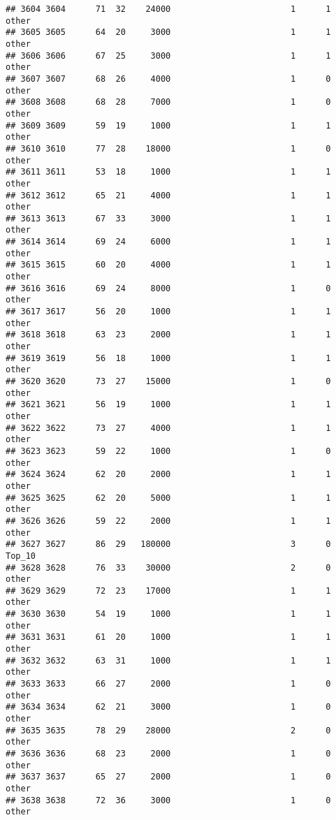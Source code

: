 \documentclass[
]{article}
\begin{document}
\begin{verbatim}
## 3604 3604      71  32    24000                        1      1    other
## 3605 3605      64  20     3000                        1      1    other
## 3606 3606      67  25     3000                        1      1    other
## 3607 3607      68  26     4000                        1      0    other
## 3608 3608      68  28     7000                        1      0    other
## 3609 3609      59  19     1000                        1      1    other
## 3610 3610      77  28    18000                        1      0    other
## 3611 3611      53  18     1000                        1      1    other
## 3612 3612      65  21     4000                        1      1    other
## 3613 3613      67  33     3000                        1      1    other
## 3614 3614      69  24     6000                        1      1    other
## 3615 3615      60  20     4000                        1      1    other
## 3616 3616      69  24     8000                        1      0    other
## 3617 3617      56  20     1000                        1      1    other
## 3618 3618      63  23     2000                        1      1    other
## 3619 3619      56  18     1000                        1      1    other
## 3620 3620      73  27    15000                        1      0    other
## 3621 3621      56  19     1000                        1      1    other
## 3622 3622      73  27     4000                        1      1    other
## 3623 3623      59  22     1000                        1      0    other
## 3624 3624      62  20     2000                        1      1    other
## 3625 3625      62  20     5000                        1      1    other
## 3626 3626      59  22     2000                        1      1    other
## 3627 3627      86  29   180000                        3      0   Top_10
## 3628 3628      76  33    30000                        2      0    other
## 3629 3629      72  23    17000                        1      1    other
## 3630 3630      54  19     1000                        1      1    other
## 3631 3631      61  20     1000                        1      1    other
## 3632 3632      63  31     1000                        1      1    other
## 3633 3633      66  27     2000                        1      0    other
## 3634 3634      62  21     3000                        1      0    other
## 3635 3635      78  29    28000                        2      0    other
## 3636 3636      68  23     2000                        1      0    other
## 3637 3637      65  27     2000                        1      0    other
## 3638 3638      72  36     3000                        1      0    other

\end{verbatim}
\end{document}
